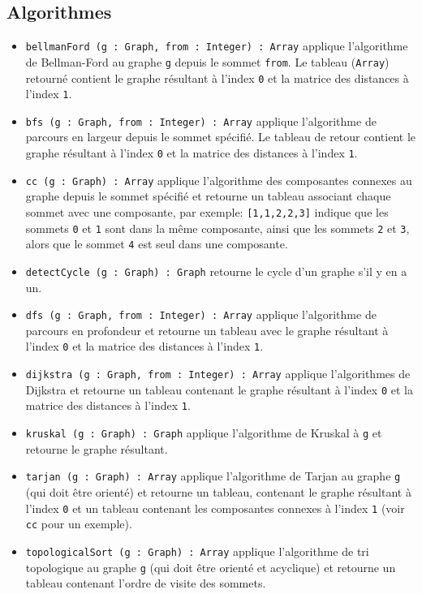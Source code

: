 \documentclass[french]{article}
\begin{document}
		\subsection{Algorithmes}
		\begin{itemize}
			\item \texttt{bellmanFord (g : Graph, from : Integer) : Array} applique l'algorithme de Bellman-Ford au graphe \texttt{g} depuis le sommet \texttt{from}. Le tableau (\texttt{Array}) retourné contient le graphe résultant à l'index \texttt{0} et la matrice des distances à l'index \texttt{1}.
			\item \texttt{bfs (g : Graph, from : Integer) : Array} applique l'algorithme de parcours en largeur depuis le sommet spécifié. Le tableau de retour contient le graphe résultant à l'index \texttt{0} et la matrice des distances à l'index \texttt{1}.
			\item \texttt{cc (g : Graph) : Array} applique l'algorithme des composantes connexes au graphe depuis le sommet spécifié et retourne un tableau associant chaque sommet avec une composante, par exemple: \texttt{[1,1,2,2,3]} indique que les sommets \texttt{0} et \texttt{1} sont dans la même composante, ainsi que les sommets \texttt{2} et \texttt{3}, alors que le sommet \texttt{4} est seul dans une composante.
			\item \texttt{detectCycle (g : Graph) : Graph} retourne le cycle d'un graphe s'il y en a un.
			\item \texttt{dfs (g : Graph, from : Integer) : Array} applique l'algorithme de parcours en profondeur et retourne un tableau avec le graphe résultant à l'index \texttt{0} et la matrice des distances à l'index \texttt{1}.
			\item \texttt{dijkstra (g : Graph, from : Integer) : Array} applique l'algorithmes de Dijkstra et retourne un tableau contenant le graphe résultant à l'index \texttt{0} et la matrice des distances à l'index \texttt{1}.
			\item \texttt{kruskal (g : Graph) : Graph} applique l'algorithme de Kruskal à \texttt{g} et retourne le graphe résultant.
			\item \texttt{tarjan (g : Graph) : Array} applique l'algorithme de Tarjan au graphe \texttt{g} (qui doit être orienté) et retourne un tableau, contenant le graphe résultant à l'index \texttt{0} et un tableau contenant les composantes connexes à l'index \texttt{1} (voir \texttt{cc} pour un exemple).
			\item \texttt{topologicalSort (g : Graph) : Array} applique l'algorithme de tri topologique au graphe \texttt{g} (qui doit être orienté et acyclique) et retourne un tableau contenant l'ordre de visite des sommets.

\end{itemize}
\end{document}
